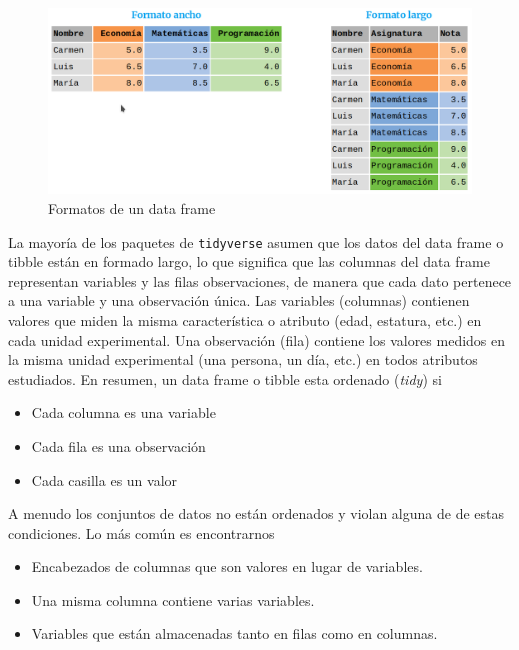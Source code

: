 \documentclass[
  a4paper,
]{scrreport}
\providecommand{\tightlist}{%
  \setlength{\itemsep}{0pt}\setlength{\parskip}{0pt}}\usepackage{longtable,booktabs,array}
\theoremstyle{definition}
\theoremstyle{definition}
\theoremstyle{remark}
\begin{document}
\begin{figure}

{\centering \includegraphics{img/05-preprocesamiento/formatos-dataframe.png}

}

\caption{Formatos de un data frame}

\end{figure}

La mayoría de los paquetes de \texttt{tidyverse} asumen que los datos
del data frame o tibble están en formado largo, lo que significa que las
columnas del data frame representan variables y las filas observaciones,
de manera que cada dato pertenece a una variable y una observación
única. Las variables (columnas) contienen valores que miden la misma
característica o atributo (edad, estatura, etc.) en cada unidad
experimental. Una observación (fila) contiene los valores medidos en la
misma unidad experimental (una persona, un día, etc.) en todos atributos
estudiados. En resumen, un data frame o tibble esta ordenado
(\emph{tidy}) si

\begin{itemize}
\tightlist
\item
  Cada columna es una variable
\item
  Cada fila es una observación
\item
  Cada casilla es un valor
\end{itemize}

A menudo los conjuntos de datos no están ordenados y violan alguna de de
estas condiciones. Lo más común es encontrarnos

\begin{itemize}
\tightlist
\item
  Encabezados de columnas que son valores en lugar de variables.
\item
  Una misma columna contiene varias variables.
\item
  Variables que están almacenadas tanto en filas como en columnas.
\end{itemize}
\end{document}
